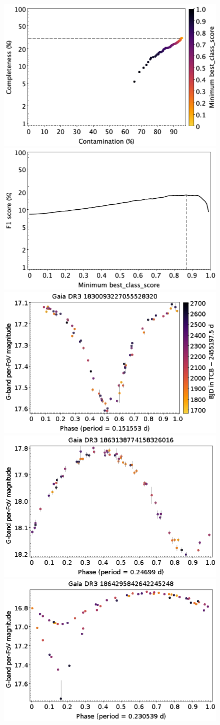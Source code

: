 \documentclass[longauth]{aa}
\begin{document}
\begin{appendix}
\begin{figure}
\centering
{} \includegraphics[width=0.45\hsize]{figures/appendix/S_cls_scc.png}  
\hspace{2mm}
 \includegraphics[width=0.45\hsize]{figures/appendix/S_cls_sf1.png} \\ 
\vspace{4mm}
 \includegraphics[width=0.45\hsize]{figures/appendix/STS-18.png}  
\hspace{2mm}
 \includegraphics[width=0.45\hsize]{figures/appendix/STS-28.png} \\
\vspace{4mm}
 \includegraphics[width=0.45\hsize]{figures/appendix/STS-29.png}  

\end{figure}
\end{appendix}
\end{document}
